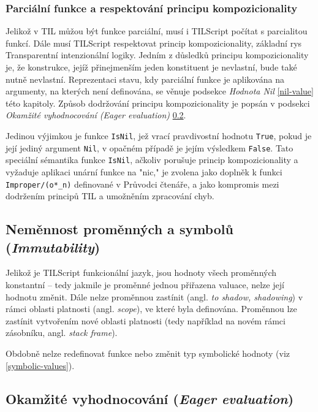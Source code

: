 \subsubsection{Parciální funkce a respektování principu kompozicionality}

Jelikož v TIL můžou být funkce parciální, musí i TILScript počítat s parcialitou funkcí. Dále musí
TILScript respektovat princip kompozicionality, základní rys Transparentní intenzionální logiky.
Jedním z důsledků principu kompozicionality je, že konstrukce, jejíž přinejmenším jeden konstituent
je nevlastní, bude také nutně nevlastní. Reprezentaci stavu, kdy parciální funkce je aplikována
na argumenty, na kterých není definována, se věnuje podsekce \textit{Hodnota Nil} \ref{nil-value}
této kapitoly. Způsob dodržování principu kompozicionality je popsán v podsekci
\textit{Okamžité vyhodnocování (Eager evaluation)} \ref{eager-eval}.

Jedinou výjimkou je funkce \lstinline{IsNil}, jež vrací pravdivostní hodnotu \lstinline{True},
pokud je její jediný argument \lstinline{Nil}, v opačném případě je jejím výsledkem
\lstinline{False}. Tato speciální sémantika funkce \lstinline{IsNil}, ačkoliv porušuje princip
kompozicionality a vyžaduje aplikaci unární funkce na "nic," je zvolena jako doplněk k funkci
\lstinline{Improper/(o*_n)} definované v Průvodci čtenáře, a jako kompromis mezi dodržením
principů TIL a umožněním zpracování chyb.

\subsection{Neměnnost proměnných a symbolů (\textit{Immutability})}

Jelikož je TILScript funkcionální jazyk, jsou hodnoty všech proměnných konstantní -- tedy
jakmile je proměnné jednou přiřazena valuace, nelze její hodnotu změnit. Dále nelze proměnnou
zastínit (angl. \textit{to shadow, shadowing}) v rámci oblasti platnosti (angl. \textit{scope}),
ve které byla definována. Proměnnou lze zastínit vytvořením nové oblasti platnosti (tedy například
na novém rámci zásobníku, angl. \textit{stack frame}).

Obdobně nelze redefinovat funkce nebo změnit typ symbolické hodnoty (viz \ref{symbolic-values}).

\subsection{Okamžité vyhodnocování (\textit{Eager evaluation})} \label{eager-eval}


